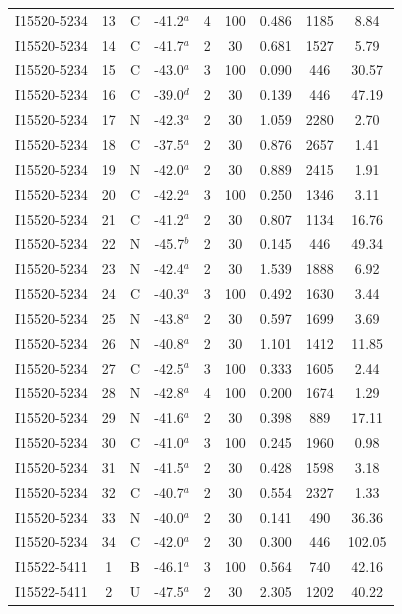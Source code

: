 \begin{table}
\begin{tabular}{ccccccccc}
I15520-5234 & 13 & C & -41.2$^{a}$ & 4 & 100 & 0.486 & 1185 & 8.84 \\
I15520-5234 & 14 & C & -41.7$^{a}$ & 2 & 30 & 0.681 & 1527 & 5.79 \\
I15520-5234 & 15 & C & -43.0$^{a}$ & 3 & 100 & 0.090 & 446 & 30.57 \\
I15520-5234 & 16 & C & -39.0$^{d}$ & 2 & 30 & 0.139 & 446 & 47.19 \\
I15520-5234 & 17 & N & -42.3$^{a}$ & 2 & 30 & 1.059 & 2280 & 2.70 \\
I15520-5234 & 18 & C & -37.5$^{a}$ & 2 & 30 & 0.876 & 2657 & 1.41 \\
I15520-5234 & 19 & N & -42.0$^{a}$ & 2 & 30 & 0.889 & 2415 & 1.91 \\
I15520-5234 & 20 & C & -42.2$^{a}$ & 3 & 100 & 0.250 & 1346 & 3.11 \\
I15520-5234 & 21 & C & -41.2$^{a}$ & 2 & 30 & 0.807 & 1134 & 16.76 \\
I15520-5234 & 22 & N & -45.7$^{b}$ & 2 & 30 & 0.145 & 446 & 49.34 \\
I15520-5234 & 23 & N & -42.4$^{a}$ & 2 & 30 & 1.539 & 1888 & 6.92 \\
I15520-5234 & 24 & C & -40.3$^{a}$ & 3 & 100 & 0.492 & 1630 & 3.44 \\
I15520-5234 & 25 & N & -43.8$^{a}$ & 2 & 30 & 0.597 & 1699 & 3.69 \\
I15520-5234 & 26 & N & -40.8$^{a}$ & 2 & 30 & 1.101 & 1412 & 11.85 \\
I15520-5234 & 27 & C & -42.5$^{a}$ & 3 & 100 & 0.333 & 1605 & 2.44 \\
I15520-5234 & 28 & N & -42.8$^{a}$ & 4 & 100 & 0.200 & 1674 & 1.29 \\
I15520-5234 & 29 & N & -41.6$^{a}$ & 2 & 30 & 0.398 & 889 & 17.11 \\
I15520-5234 & 30 & C & -41.0$^{a}$ & 3 & 100 & 0.245 & 1960 & 0.98 \\
I15520-5234 & 31 & N & -41.5$^{a}$ & 2 & 30 & 0.428 & 1598 & 3.18 \\
I15520-5234 & 32 & C & -40.7$^{a}$ & 2 & 30 & 0.554 & 2327 & 1.33 \\
I15520-5234 & 33 & N & -40.0$^{a}$ & 2 & 30 & 0.141 & 490 & 36.36 \\
I15520-5234 & 34 & C & -42.0$^{a}$ & 2 & 30 & 0.300 & 446 & 102.05 \\
I15522-5411 & 1 & B & -46.1$^{a}$ & 3 & 100 & 0.564 & 740 & 42.16 \\
I15522-5411 & 2 & U & -47.5$^{a}$ & 2 & 30 & 2.305 & 1202 & 40.22 \\

\end{tabular}
\end{table}
